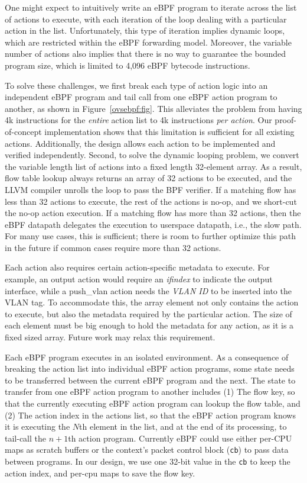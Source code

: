 \documentclass[10pt,numbers,reprint]{sigplanconf}
\begin{document}
One might expect to intuitively write an eBPF program to iterate across the
list of actions to execute, with each iteration of the loop dealing with a
particular action in the list.  Unfortunately, this type of iteration implies
dynamic loops, which are restricted within the eBPF forwarding model. Moreover,
the variable number of actions also implies that there is no way to guarantee
the bounded program size, which is limited to 4,096 eBPF bytecode instructions.

To solve these challenges, we first break each type of action logic into an
independent eBPF program and tail call from one eBPF action program to
another, as shown in Figure~\ref{ovsebpf:fig}.  This alleviates
the problem from having 4k instructions for the {\em entire} action list to 4k
instructions {\em per action}.  Our proof-of-concept implementation shows that
this limitation is sufficient for all existing actions.  Additionally, the
design allows each action to be implemented and verified independently.
Second, to solve the dynamic looping problem, we convert the variable length
list of actions into a fixed length 32-element array.  As a result,
flow table lookup always returns an array of 32 actions to be executed,
and the LLVM compiler unrolls the loop to pass the BPF verifier.
If a matching flow has less than 32 actions to execute, the rest of the
actions is no-op, and we short-cut the no-op action execution. 
If a matching flow has more than 32 actions, then the eBPF datapath delegates
the execution to userspace datapath, i.e., the slow path. For many use cases,
this is sufficient; there is room to further optimize this path in the future
if common cases require more than 32 actions.

Each action also requires certain action-specific metadata to execute.
For example, an output action would require an {\em ifindex} to
indicate the output interface, while a push\_vlan action needs the {\em VLAN ID}
to be inserted into the VLAN tag.  To accommodate this, the array element not
only contains the action to execute, but also the metadata required by the
particular action. The size of each element must be big enough to hold the
metadata for any action, as it is a fixed sized array. Future work may
relax this requirement.

Each eBPF program executes in an isolated environment. As a consequence
of breaking the action list into individual eBPF action programs, some state needs to be
transferred between the current eBPF program and the next.
The state to transfer from one eBPF action program to another includes
(1) The flow key, so that the currently executing eBPF action program can
lookup the flow table, and (2) The action index in the actions list, so that
the eBPF action program knows it is executing the $N$th element in the list,
and at the end of its processing, to tail-call the $n+1$th action program.
Currently eBPF could use either per-CPU maps as scratch buffers or the
context's packet control block (\verb+cb+) to pass data between programs. In our
design, we use one 32-bit value in the \verb+cb+ to keep the action
index, and per-cpu maps to save the flow key.
\end{document}
